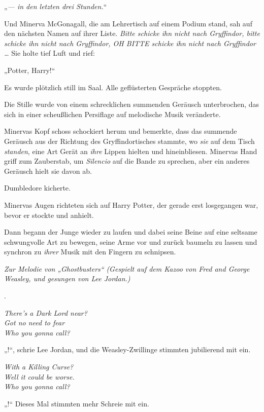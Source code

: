 „\emph{— in den letzten drei Stunden.}“

Und Minerva McGonagall, die am Lehrertisch auf einem Podium stand, sah auf den nächsten Namen auf ihrer Liste. \emph{Bitte schicke ihn nicht nach Gryffindor, bitte schicke ihn nicht nach Gryffindor, OH BITTE schicke ihn nicht nach Gryffindor …} Sie holte tief Luft und rief:

„Potter, Harry!“

Es wurde plötzlich still im Saal. Alle geflüsterten Gespräche stoppten.

Die Stille wurde von einem schrecklichen summenden Geräusch unterbrochen, das sich in einer scheußlichen Persiflage auf melodische Musik veränderte.

Minervas Kopf schoss schockiert herum und bemerkte, dass das summende Geräusch aus der Richtung des Gryffindortisches stammte, wo \emph{sie} auf dem Tisch \emph{standen}, eine Art Gerät an \emph{ihre} Lippen hielten und hineinbliesen. Minervas Hand griff zum Zauberstab, um \emph{Silencio} auf die Bande zu sprechen, aber ein anderes Geräusch hielt sie davon ab.

Dumbledore kicherte.

Minervas Augen richteten sich auf Harry Potter, der gerade erst losgegangen war, bevor er stockte und anhielt.

Dann begann der Junge wieder zu laufen und dabei seine Beine auf eine seltsame schwungvolle Art zu bewegen, seine Arme vor und zurück baumeln zu lassen und synchron zu \emph{ihrer} Musik mit den Fingern zu schnipsen.

\begin{center}
\emph{Zur Melodie von „Ghostbusters“}
\emph{(Gespielt auf dem Kazoo von Fred and George Weasley,
und gesungen von Lee Jordan.)}

.

\emph{There’s a Dark Lord near?\\
Got no need to fear\\
Who you gonna call?}
\end{center}

„!“, schrie Lee Jordan, und die Weasley-Zwillinge stimmten jubilierend mit ein.

\begin{center}
\emph{With a Killing Curse?\\
Well it could be worse.\\
Who you gonna call?}
\end{center}

„!“ Dieses Mal stimmten mehr Schreie mit ein.


